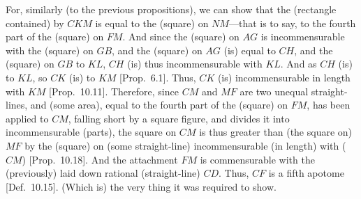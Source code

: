 \begin{Parallel}{}{}
{For, similarly (to the previous propositions), we can show that the
(rectangle contained) by $CKM$ is equal to the (square) on $NM$---that is
to say, to the fourth part of the (square) on $FM$.  And since the (square)
on $AG$ is incommensurable with the (square) on $GB$, and  the
(square) on $AG$ (is)
equal to $CH$, and the (square) on $GB$ to $KL$, $CH$ (is) thus
incommensurable with $KL$. And as $CH$ (is) to $KL$, so
$CK$ (is) to $KM$ [Prop.~6.1]. 
Thus, $CK$ (is) incommensurable in length with $KM$ [Prop.~10.11]. Therefore, since $CM$ and $MF$
are two unequal straight-lines, and (some area), equal to the
fourth part of the (square) on $FM$, has been applied to $CM$, falling
short by a square figure, and divides it into incommensurable
(parts), the square on $CM$ is thus greater than (the square on) $MF$
by the (square) on (some straight-line) incommensurable (in length)
with ($CM$) [Prop.~10.18]. And the attachment
$FM$ is commensurable with the (previously) laid down
rational (straight-line) $CD$. Thus, $CF$ is a fifth apotome [Def.~10.15]. (Which is) the very thing it was required to show.}
\end{Parallel}


